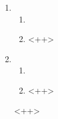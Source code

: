 \documentclass[12pt]{article}
\begin{document}
\begin{enumerate}[leftmargin=16pt]
    \item <++>
        \begin{enumerate}[leftmargin=8pt]
            \item <++>

            \item <++>

            <++>

        \end{enumerate}
    \item <++>
        \begin{enumerate}[leftmargin=8pt]

            \item <++>

            \item <++>

            <++>

        \end{enumerate}

    <++>
\end{enumerate}
\end{document}

